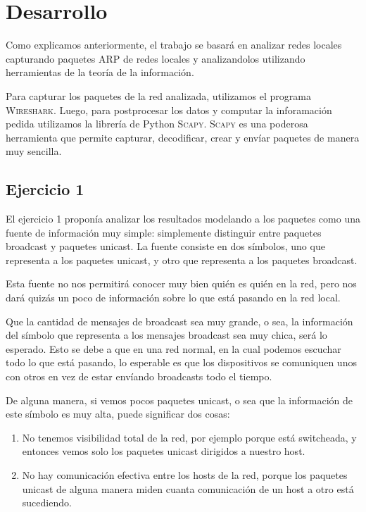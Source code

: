 \section{Desarrollo}

\PARstart Como explicamos anteriormente, el trabajo se basará en analizar redes locales capturando paquetes ARP de redes locales y analizandolos utilizando herramientas de la teoría de la información.

Para capturar los paquetes de la red analizada, utilizamos el programa \textsc{Wireshark}. Luego, para postprocesar los datos y computar la inforamación pedida utilizamos la librería de Python \textsc{Scapy}. \textsc{Scapy} es una poderosa herramienta que permite capturar, decodificar, crear y envíar paquetes de manera muy sencilla.

\subsection{Ejercicio 1}

El ejercicio 1 proponía analizar los resultados modelando a los paquetes como una fuente de información muy simple: simplemente distinguir entre paquetes broadcast y paquetes unicast. La fuente consiste en dos símbolos, uno que representa a los paquetes unicast, y otro que representa a los paquetes broadcast.

Esta fuente no nos permitirá conocer muy bien quién es quién en la red, pero nos dará quizás un poco de información sobre lo que está pasando en la red local.

Que la cantidad de mensajes de broadcast sea muy grande, o sea, la información del símbolo que representa a los mensajes broadcast sea muy chica, será lo esperado. Esto se debe a que en una red normal, en la cual podemos escuchar todo lo que está pasando, lo esperable es que los dispositivos se comuniquen unos con otros en vez de estar envíando broadcasts todo el tiempo.

De alguna manera, si vemos pocos paquetes unicast, o sea que la información de este símbolo es muy alta, puede significar dos cosas:

\begin{enumerate}
  \item No tenemos visibilidad total de la red, por ejemplo porque está switcheada, y entonces vemos solo los paquetes unicast dirigidos a nuestro host.
  \item No hay comunicación efectiva entre los hosts de la red, porque los paquetes unicast de alguna manera miden cuanta comunicación de un host a otro está sucediendo.
\end{enumerate}

